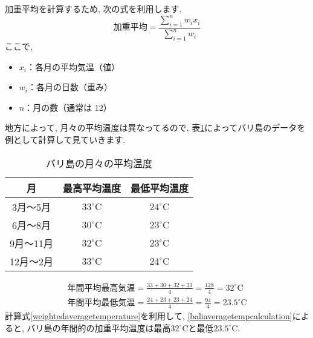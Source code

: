 \documentclass[a4j, twocolumn]{jarticle}
\begin{document}
  加重平均を計算するため, 次の式を利用します. \\
  \begin{equation}
    加重平均 = \frac{\sum_{i=1}^{n} w_i x_i}{\sum_{i=1}^{n} w_i}
  \end{equation}\label{weightedaveragetemperature}
  ここで, 
  \begin{itemize}
    \item \( x_i \)：各月の平均気温（値）
    \item \( w_i \)：各月の日数（重み）
    \item \( n \)：月の数（通常は 12）
  \end{itemize}
  地方によって, 月々の平均温度は異なってるので, 表\ref{baliaveragetemp}によってバリ島のデータを例として計算して見ていきます\cite{intrepid2023weather}. \\
  \begin{table}[h]
    \caption{バリ島の月々の平均温度}\label{baliaveragetemp}
    \centering
    \begin{tabular}{|c|c|c|}
      \hline
      月 & 最高平均温度 & 最低平均温度 \\
      \hline
      3月～5月 & $33^\circ\mathrm{C}$ & $24^\circ\mathrm{C}$ \\
      \hline
      6月～8月 & $30^\circ\mathrm{C}$ & $23^\circ\mathrm{C}$  \\
      \hline
      9月～11月 & $32^\circ\mathrm{C}$ & $23^\circ\mathrm{C}$ \\
      \hline
      12月～2月 & $33^\circ\mathrm{C}$ & $24^\circ\mathrm{C}$ \\
      \hline
    \end{tabular}
  \end{table}
  \begin{equation}\label{baliaveragetempcalculation}
    \begin{aligned}
      年間平均最高気温 = \frac{33 + 30 + 32 + 33}{4} = \frac{128}{4} = 32^\circ\mathrm{C} \\
      年間平均最低気温 = \frac{24 + 23 + 23 + 24}{4} = \frac{94}{4} = 23.5^\circ\mathrm{C}
    \end{aligned}
  \end{equation}
  計算式\ref{weightedaveragetemperature}を利用して, \ref{baliaveragetempcalculation}によると, バリ島の年間的の加重平均温度は最高$32^\circ\mathrm{C}$と最低$23.5^\circ\mathrm{C}$\cite{mendenhall2013introduction}.
\end{document}
